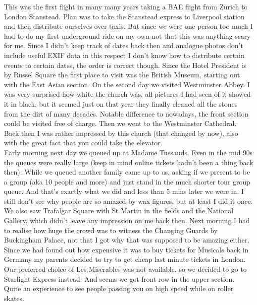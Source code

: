 This was the first flight in many many years taking a BAE flight from Zurich to London Stanstead. Plan was to take the Stanstead express to Liverpool station and then distribute ourselves over taxis. But since we were one person too much I had to do my first underground ride on my own not that this was anything scary for me. Since I didn't keep track of dates back then and analogue photos don't include useful EXIF data in this respect I don't know how to distribute certain events to certain dates, the order is correct though. Since the Hotel President is by Russel Square the first place to visit was the British Museum, starting out with the East Asian section. On the second day we visited Westminster Abbey. I was very surprised how white the church was, all pictures I had seen of it showed it in black, but it seemed just on that year they finally cleaned all the stones from the dirt of many decades. Notable difference to nowadays, the front section could be visited free of charge. Then we went to the Westminster Cathedral. Back then I was rather impressed by this church (that changed by now), also with the great fact that you could take the elevator.\\
 Early morning next day we queued up at Madame Tussauds. Even in the mid 90s the queues were really large (keep in mind online tickets hadn't been a thing back then). While we queued another family came up to us, asking if we present to be a group (aka 10 people and more) and just stand in the much shorter tour group queue. And that's exactly what we did and less than 5 mins later we were in. I still don't see why people are so amazed by wax figures, but at least I did it once. We also saw Trafalgar Square with St Martin in the fields and the National Gallery, which didn't leave any impression on me back then. Next morning I had to realise how huge the crowd was to witness the Changing Guards by Buckingham Palace, not that I got why that was supposed to be amazing either. Since we had found out how expensive it was to buy tickets for Musicals back in Germany my parents decided to try to get cheap last minute tickets in London. Our preferred choice of Les Miserables was not available, so we decided to go to Starlight Express instead. And seems we got front row in the upper section. Quite an experience to see people passing you on high speed while on roller skates. \\
